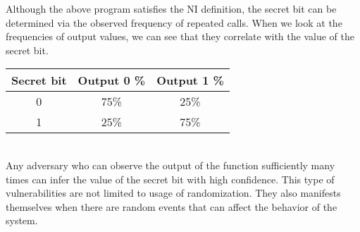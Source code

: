 \begin{comment}
Here is a table for all possible ways an execution of above function could go:\\

\begin{tabular}{| c | c | c | c | c |}
	\hline
	 & Secret Bit & First Random Bit & Output & Noninterfering Execution \\
	\hline
	a &	0 & 0 & 0 & d \\
	\hline
	b &	0 & 0 & 1 & e \\
	\hline
	c &	0 & 1 & 0 & d \\
	\hline
	\hline
	d &	1 & 0 & 0 & a \\
	\hline
	e &	1 & 0 & 1 & b \\
	\hline
	f &	1 & 1 & 1 & b \\
	\hline
\end{tabular}\\

For each state and an execution from it, there is a corresponding execution from each related state with same return value. If a related state has same secret bit value, first execution is also the second execution. If a related state has opposite secret bit value, then corresponding execution is given in the above table. This demonstrates how given code snippet satisfies NI.
\end{comment}

Although the above program satisfies the NI definition, the secret bit can be determined via the observed frequency of repeated calls. When we look at the frequencies of output values, we can see that they correlate with the value of the secret bit.\\

\begin{tabular}{| c | c | c |}
	\hline
	Secret bit & Output 0 \% & Output 1 \% \\
	\hline
	0 &	75\% & 25\% \\
	\hline
	1 &	25\% & 75\% \\
	\hline
\end{tabular}\\

Any adversary who can observe the output of the function sufficiently many times can infer the value of the secret bit with high confidence. This type of vulnerabilities are not limited to usage of randomization. They also manifests themselves when there are random events that can affect the behavior of the system. 


